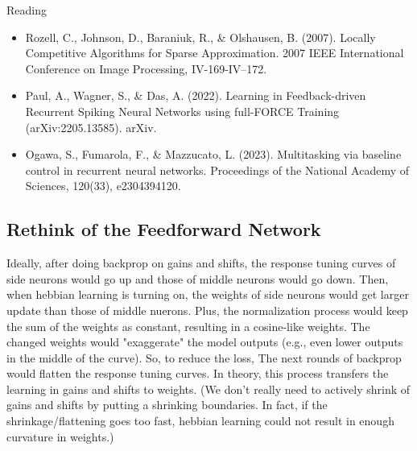 \documentclass[12pt, a4paper]{article}
\begin{document}
\noindent
Reading

\begin{itemize}
    \item Rozell, C., Johnson, D., Baraniuk, R., \& Olshausen, B. (2007). Locally Competitive Algorithms for Sparse Approximation. 2007 IEEE International Conference on Image Processing, IV-169-IV–172.
    \item Paul, A., Wagner, S., \& Das, A. (2022). Learning in Feedback-driven Recurrent Spiking Neural Networks using full-FORCE Training (arXiv:2205.13585). arXiv.
    \item Ogawa, S., Fumarola, F., \& Mazzucato, L. (2023). Multitasking via baseline control in recurrent neural networks. Proceedings of the National Academy of Sciences, 120(33), e2304394120.
\end{itemize}

\subsection*{Rethink of the Feedforward Network}


Ideally, after doing backprop on gains and shifts, the response tuning curves of side neurons would go up and those of middle neurons would go down. Then, when hebbian learning is turning on, the weights of side neurons would get larger update than those of middle nuerons. Plus, the normalization process would keep the sum of the weights as constant, resulting in a cosine-like weights. The changed weights would "exaggerate" the model outputs (e.g., even lower outputs in the middle of the curve). So, to reduce the loss, The next rounds of backprop would flatten the response tuning curves. In theory, this process transfers the learning in gains and shifts to weights. (We don't really need to actively shrink of gains and shifts by putting a shrinking boundaries. In fact, if the shrinkage/flattening goes too fast, hebbian learning could not result in enough curvature in weights.)
\end{document}
